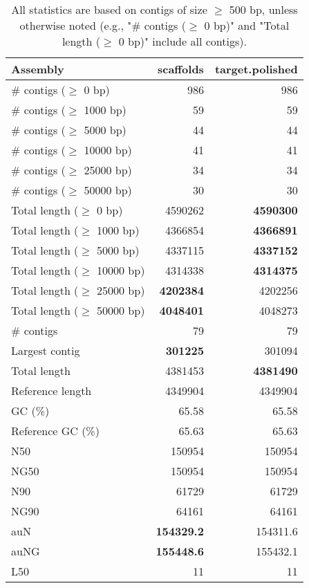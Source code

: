 \documentclass[12pt,a4paper]{article}
\begin{document}
\begin{table}[ht]
\begin{center}
\caption{All statistics are based on contigs of size $\geq$ 500 bp, unless otherwise noted (e.g., "\# contigs ($\geq$ 0 bp)" and "Total length ($\geq$ 0 bp)" include all contigs).}
\begin{tabular}{|l*{2}{|r}|}
\hline
Assembly & scaffolds & target.polished \\ \hline
\# contigs ($\geq$ 0 bp) & 986 & 986 \\ \hline
\# contigs ($\geq$ 1000 bp) & 59 & 59 \\ \hline
\# contigs ($\geq$ 5000 bp) & 44 & 44 \\ \hline
\# contigs ($\geq$ 10000 bp) & 41 & 41 \\ \hline
\# contigs ($\geq$ 25000 bp) & 34 & 34 \\ \hline
\# contigs ($\geq$ 50000 bp) & 30 & 30 \\ \hline
Total length ($\geq$ 0 bp) & 4590262 & {\bf 4590300} \\ \hline
Total length ($\geq$ 1000 bp) & 4366854 & {\bf 4366891} \\ \hline
Total length ($\geq$ 5000 bp) & 4337115 & {\bf 4337152} \\ \hline
Total length ($\geq$ 10000 bp) & 4314338 & {\bf 4314375} \\ \hline
Total length ($\geq$ 25000 bp) & {\bf 4202384} & 4202256 \\ \hline
Total length ($\geq$ 50000 bp) & {\bf 4048401} & 4048273 \\ \hline
\# contigs & 79 & 79 \\ \hline
Largest contig & {\bf 301225} & 301094 \\ \hline
Total length & 4381453 & {\bf 4381490} \\ \hline
Reference length & 4349904 & 4349904 \\ \hline
GC (\%) & 65.58 & 65.58 \\ \hline
Reference GC (\%) & 65.63 & 65.63 \\ \hline
N50 & 150954 & 150954 \\ \hline
NG50 & 150954 & 150954 \\ \hline
N90 & 61729 & 61729 \\ \hline
NG90 & 64161 & 64161 \\ \hline
auN & {\bf 154329.2} & 154311.6 \\ \hline
auNG & {\bf 155448.6} & 155432.1 \\ \hline
L50 & 11 & 11 \\ \hline

\end{tabular}
\end{center}
\end{table}
\end{document}
